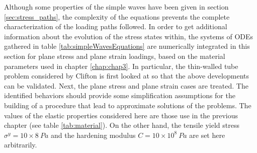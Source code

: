 Although some properties of the simple waves have been given in section \ref{sec:stress_paths}, the complexity of the equations prevents the complete characterization of the loading paths followed.
In order to get additional information about the evolution of the stress states within, the systems of ODEs gathered in table \ref{tab:simpleWavesEquations} are numerically integrated in this section for plane stress and plane strain loadings, based on the material parameters used in chapter \ref{chap:chap3}.
In particular, the thin-walled tube problem considered by Clifton \cite{Clifton} is first looked at so that the above developments can be validated.
Next, the plane stress and plane strain cases are treated.
The identified behaviors should provide some simplification assumptions for the building of a procedure that lead to approximate solutions of the problems.
The values of the elastic properties considered here are those use in the previous chapter (see table \ref{tab:material}).
On the other hand, the tensile yield stress $\sigma^y=10\times{8} \: Pa$ and the hardening modulus $C=10\times 10^8 \: Pa$ are set here arbitrarily.

